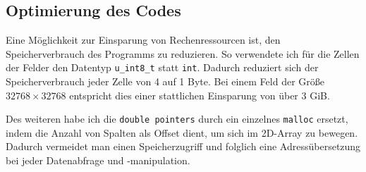 \documentclass[german,plainarticle,hyperref,utf8]{zihpub}
\begin{document}
	\subsection{Optimierung des Codes}
	Eine Möglichkeit zur Einsparung von Rechenressourcen ist, den Speicherverbrauch des Programms zu reduzieren. So verwendete ich für die Zellen der Felder den Datentyp \verb|u_int8_t| statt \verb|int|. Dadurch reduziert sich der Speicherverbrauch jeder Zelle von 4 auf 1 Byte. Bei einem Feld der Größe $32768\times 32768$ entspricht dies einer stattlichen Einsparung von über 3 GiB.
		
	Des weiteren habe ich die \verb|double pointers| durch ein einzelnes \verb|malloc| ersetzt, indem die Anzahl von Spalten als Offset dient, um sich im 2D-Array zu bewegen. Dadurch vermeidet man einen Speicherzugriff und folglich eine Adressübersetzung bei jeder Datenabfrage und -manipulation.
\end{document}
